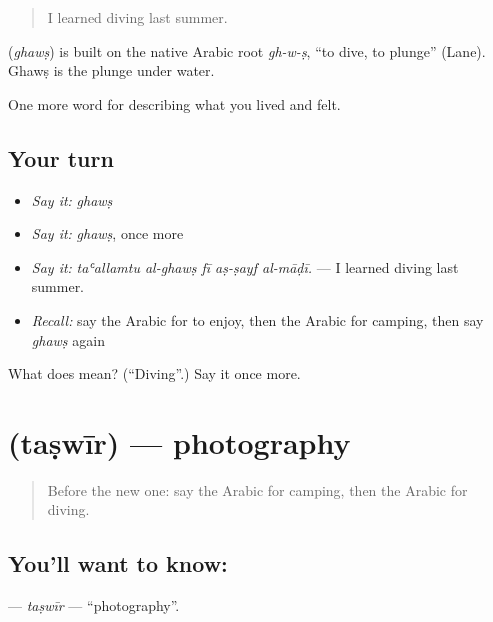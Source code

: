 \begin{quote}
I learned diving last summer.
\end{quote}

\begin{cousinweb}
\textbf{} (\emph{ghawṣ}) is built on the native Arabic root \emph{gh-w-ṣ}, \textquotedblleft{}to dive, to plunge\textquotedblright{} (Lane). Ghawṣ is the plunge under water.
\end{cousinweb}

\begin{grammarlens}[title={What you've built}]
One more word for describing what you lived and felt.
\end{grammarlens}

\subsection*{Your turn}
\begin{itemize}
\raggedright
  \item \emph{Say it:} \emph{ghawṣ}
  \item \emph{Say it:} \emph{ghawṣ}, once more
  \item \emph{Say it:} \emph{taʿallamtu al-ghawṣ fī aṣ-ṣayf al-māḍī.} — I learned diving last summer.
  \item \emph{Recall:} say the Arabic for to enjoy, then the Arabic for camping, then say \emph{ghawṣ} again
\end{itemize}

\begin{tcolorbox}[breakable,colback=teal!4,colframe=teal!35!black,title={Before you move on}]
What does  mean? (\textquotedblleft{}Diving\textquotedblright{}.) Say it once more.
\end{tcolorbox}
\section[\texorpdfstring{\ar{تصوير} (taṣwīr)}{تصوير (taṣwīr)}]{ (taṣwīr) — photography}

\label{lesson:AR-C537-taswir}



\begin{quote}
Before the new one: say the Arabic for camping, then the Arabic for diving.
\end{quote}

\subsection*{You'll want to know: }
\textbf{} — \emph{taṣwīr} — \textquotedblleft{}photography\textquotedblright{}.

